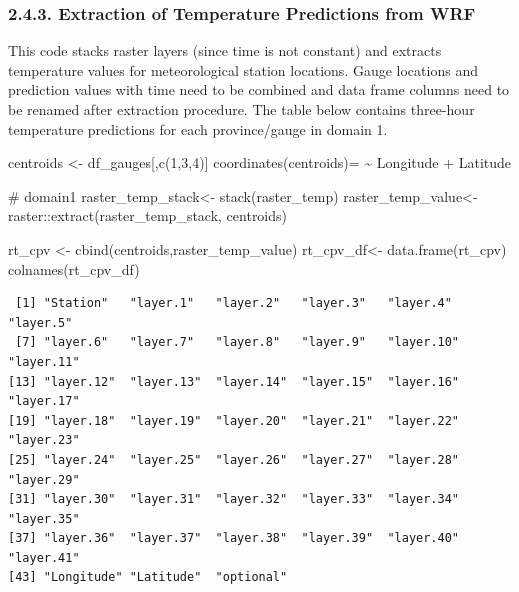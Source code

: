 \documentclass[
  letterpaper,
  DIV=11,
  numbers=noendperiod,
  abstract]{scrartcl}
\newenvironment{Shaded}{\begin{snugshade}}{\end{snugshade}}
\newcommand{\CommentTok}[1]{\textcolor[rgb]{0.37,0.37,0.37}{#1}}
\newcommand{\DecValTok}[1]{\textcolor[rgb]{0.68,0.00,0.00}{#1}}
\newcommand{\ErrorTok}[1]{\textcolor[rgb]{0.68,0.00,0.00}{#1}}
\newcommand{\FunctionTok}[1]{\textcolor[rgb]{0.28,0.35,0.67}{#1}}
\newcommand{\NormalTok}[1]{\textcolor[rgb]{0.00,0.23,0.31}{#1}}
\newcommand{\OtherTok}[1]{\textcolor[rgb]{0.00,0.23,0.31}{#1}}
\newcommand{\SpecialCharTok}[1]{\textcolor[rgb]{0.37,0.37,0.37}{#1}}
\begin{document}
\hypertarget{extraction-of-temperature-predictions-from-wrf}{%
\subsubsection{2.4.3. Extraction of Temperature Predictions from
WRF}\label{extraction-of-temperature-predictions-from-wrf}}

This code stacks raster layers (since time is not constant) and extracts
temperature values for meteorological station locations. Gauge locations
and prediction values with time need to be combined and data frame
columns need to be renamed after extraction procedure. The table below
contains three-hour temperature predictions for each province/gauge in
domain 1.

\begin{Shaded}
\begin{Highlighting}[]
\NormalTok{centroids }\OtherTok{\textless{}{-}}\NormalTok{ df\_gauges[,}\FunctionTok{c}\NormalTok{(}\DecValTok{1}\NormalTok{,}\DecValTok{3}\NormalTok{,}\DecValTok{4}\NormalTok{)]}
\FunctionTok{coordinates}\NormalTok{(centroids)}\OtherTok{=} \ErrorTok{\textasciitilde{}}\NormalTok{ Longitude }\SpecialCharTok{+}\NormalTok{ Latitude}

\CommentTok{\# domain1}
\NormalTok{raster\_temp\_stack}\OtherTok{\textless{}{-}} \FunctionTok{stack}\NormalTok{(raster\_temp)}
\NormalTok{raster\_temp\_value}\OtherTok{\textless{}{-}}\NormalTok{ raster}\SpecialCharTok{::}\FunctionTok{extract}\NormalTok{(raster\_temp\_stack, centroids)}

\NormalTok{rt\_cpv }\OtherTok{\textless{}{-}} \FunctionTok{cbind}\NormalTok{(centroids,raster\_temp\_value)}
\NormalTok{rt\_cpv\_df}\OtherTok{\textless{}{-}} \FunctionTok{data.frame}\NormalTok{(rt\_cpv)}
\FunctionTok{colnames}\NormalTok{(rt\_cpv\_df)}
\end{Highlighting}
\end{Shaded}

\begin{verbatim}
 [1] "Station"   "layer.1"   "layer.2"   "layer.3"   "layer.4"   "layer.5"  
 [7] "layer.6"   "layer.7"   "layer.8"   "layer.9"   "layer.10"  "layer.11" 
[13] "layer.12"  "layer.13"  "layer.14"  "layer.15"  "layer.16"  "layer.17" 
[19] "layer.18"  "layer.19"  "layer.20"  "layer.21"  "layer.22"  "layer.23" 
[25] "layer.24"  "layer.25"  "layer.26"  "layer.27"  "layer.28"  "layer.29" 
[31] "layer.30"  "layer.31"  "layer.32"  "layer.33"  "layer.34"  "layer.35" 
[37] "layer.36"  "layer.37"  "layer.38"  "layer.39"  "layer.40"  "layer.41" 
[43] "Longitude" "Latitude"  "optional" 
\end{verbatim}
\end{document}
